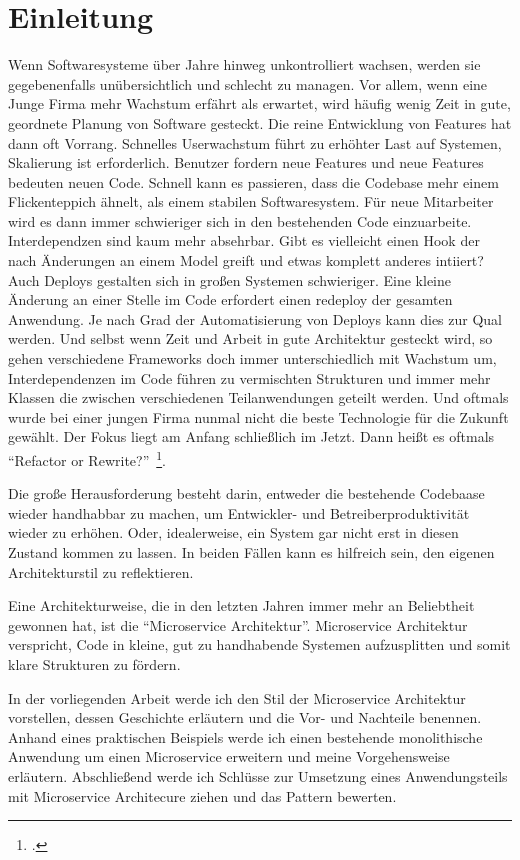 \chapter{Einleitung}
Wenn Softwaresysteme über Jahre hinweg unkontrolliert wachsen, werden sie gegebenenfalls unübersichtlich und schlecht zu managen. Vor allem, wenn eine Junge Firma mehr Wachstum erfährt als erwartet, wird häufig wenig Zeit in gute, geordnete Planung von Software gesteckt. Die reine Entwicklung von Features hat dann oft Vorrang. Schnelles Userwachstum führt zu erhöhter Last auf Systemen, Skalierung ist erforderlich. Benutzer fordern neue Features und neue Features bedeuten neuen Code. Schnell kann es passieren, dass die Codebase mehr einem Flickenteppich ähnelt, als einem stabilen Softwaresystem. Für neue Mitarbeiter wird es dann immer schwieriger sich in den bestehenden Code einzuarbeite. Interdependzen sind kaum mehr absehrbar. Gibt es vielleicht einen Hook der nach Änderungen an einem Model greift und etwas komplett anderes intiiert? Auch Deploys gestalten sich in großen Systemen schwieriger. Eine kleine Änderung an einer Stelle im Code erfordert einen redeploy der gesamten Anwendung. Je nach Grad der Automatisierung von Deploys kann dies zur Qual werden. Und selbst wenn Zeit und Arbeit in gute Architektur gesteckt wird, so gehen verschiedene Frameworks doch immer unterschiedlich mit Wachstum um, Interdependenzen im Code führen zu vermischten Strukturen und immer mehr Klassen die zwischen verschiedenen Teilanwendungen geteilt werden. Und oftmals wurde bei einer jungen Firma nunmal nicht die beste Technologie für die Zukunft gewählt. Der Fokus liegt am Anfang schließlich im Jetzt. Dann heißt es oftmals ``Refactor or Rewrite?''~\footcite[vgl.][]{refactorrewrite}.

Die große Herausforderung besteht darin, entweder die bestehende Codebaase wieder handhabbar zu machen, um Entwickler- und Betreiberproduktivität wieder zu erhöhen. Oder, idealerweise, ein System gar nicht erst in diesen Zustand kommen zu lassen. In beiden Fällen kann es hilfreich sein, den eigenen Architekturstil zu reflektieren.

Eine Architekturweise, die in den letzten Jahren immer mehr an Beliebtheit gewonnen hat, ist die ``Microservice Architektur''. Microservice Architektur verspricht, Code in kleine, gut zu handhabende Systemen aufzusplitten und somit klare Strukturen zu fördern. 

In der vorliegenden Arbeit werde ich den Stil der Microservice Architektur vorstellen, dessen Geschichte erläutern und die Vor- und Nachteile benennen. Anhand eines praktischen Beispiels werde ich einen bestehende monolithische Anwendung um einen Microservice erweitern und meine Vorgehensweise erläutern.
Abschließend werde ich Schlüsse zur Umsetzung eines Anwendungsteils mit Microservice Architecure ziehen und das Pattern bewerten.